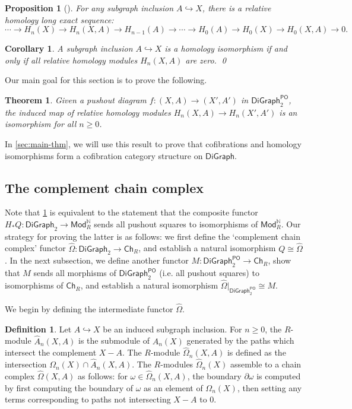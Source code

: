 \documentclass[11pt]{article}
\newtheorem{proposition}[theo]{Proposition}
\newtheorem{corollary}[theo]{Corollary}
\newtheorem{theorem}[theo]{Theorem}
\theoremstyle{definition}
\newtheorem{defi}[theo]{Definition}
\numberwithin{equation}{section}
\newcommand{\ModRN}{\mathsf{Mod}_R^{\mathbb{N}}}
\newcommand{\Ch}{\mathsf{Ch}}
\newcommand{\DiGraph}{\mathsf{DiGraph}}
\newcommand{\Cof}{\mathsf{DiGraph}_2}
\newcommand{\CofPO}{\mathsf{DiGraph}_2^{\mathsf{PO}}}
\newcommand{\tOmega}{\widehat{\Omega}}
\newcommand{\tA}{\widehat{A}}
\newcommand{\bd}{\partial}
\begin{document}
\begin{proposition}[{\cite[Thm.~3.11]{grigor'yan-jimenez-muranov-yau}}]\label{rhom-les}
For any subgraph inclusion $A \hookrightarrow X$, there is a relative homology long exact sequence:
\[
\cdots \to H_n(X) \to H_{n}(X,A) \to H_{n-1}(A) \to \cdots \to H_0(A) \to H_0(X) \to H_0(X,A) \to 0\text{.}
\]
\end{proposition}

\begin{corollary}\label{tcof-rel-hom}
A subgraph inclusion $A \hookrightarrow X$ is a homology isomorphism if and only if all relative homology modules $H_n(X,A)$ are zero. \qed
\end{corollary}

Our main goal for this section is to prove the following.

\begin{theorem}\label{pushout-rel-hom}
Given a pushout diagram $f \colon (X,A) \to (X',A')$ in $\CofPO$,
the induced map of relative homology modules $H_n(X,A) \to H_n(X',A')$ is an isomorphism for all $n \geq 0$.
\end{theorem}

In \cref{sec:main-thm}, we will use this result to prove that cofibrations and homology isomorphisms form a cofibration category structure on $\DiGraph$.

\subsection{The complement chain complex}

Note that \cref{pushout-rel-hom} is equivalent to the statement that the composite functor $H_* Q \colon \Cof \to \ModRN$ sends all pushout squares to isomorphisms of $\ModRN$. Our strategy for proving the latter is as follows: we first define the `complement chain complex' functor $\tOmega \colon \Cof \to \Ch_R$, and establish a natural isomorphism $Q \cong \tOmega$.
In the next subsection, we define another functor $M \colon \CofPO \to \Ch_R$, show that $M$ sends all morphisms of $\CofPO$ (i.e.  all pushout squares) to isomorphisms of $\Ch_R$, and establish a natural isomorphism $\tOmega|_{\CofPO} \cong M$.

We begin by defining the intermediate functor $\tOmega$.

\begin{defi}
Let $A \hookrightarrow X$ be an induced subgraph inclusion. For $n \geq 0$, the $R$-module  $\tA_n(X,A)$ is the submodule of $A_n(X)$ generated by the paths which intersect the complement $X - A$. The $R$-module $\tOmega_n(X,A)$ is defined as the intersection $\Omega_n(X) \cap \tA_n(X,A)$. The $R$-modules $\tOmega_n(X)$ assemble to a chain complex $\tOmega(X,A)$ as follows:  for $\omega \in \tOmega_n(X,A)$, the boundary $\bd \omega$ is computed by first computing the boundary of $\omega$ as an element of $\Omega_n(X)$, then setting any terms corresponding to paths not intersecting $X - A$ to $0$.
\end{defi}
\end{document}

